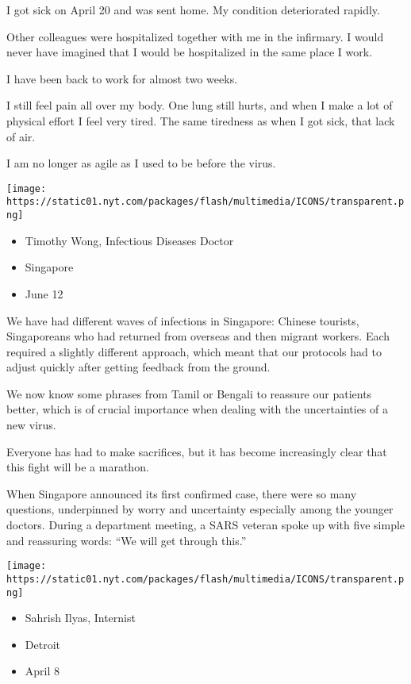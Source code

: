I got sick on April 20 and was sent home. My condition deteriorated
rapidly.

Other colleagues were hospitalized together with me in the infirmary. I
would never have imagined that I would be hospitalized in the same place
I work.

I have been back to work for almost two weeks.

I still feel pain all over my body. One lung still hurts, and when I
make a lot of physical effort I feel very tired. The same tiredness as
when I got sick, that lack of air.

I am no longer as agile as I used to be before the virus.

\texttt{[image: https://static01.nyt.com/packages/flash/multimedia/ICONS/transparent.png]}

\begin{itemize}
\tightlist
\item
  Timothy Wong, Infectious Diseases Doctor
\item
  Singapore
\item
  June 12
\end{itemize}

We have had different waves of infections in Singapore: Chinese
tourists, Singaporeans who had returned from overseas and then migrant
workers. Each required a slightly different approach, which meant that
our protocols had to adjust quickly after getting feedback from the
ground.

We now know some phrases from Tamil or Bengali to reassure our patients
better, which is of crucial importance when dealing with the
uncertainties of a new virus.

Everyone has had to make sacrifices, but it has become increasingly
clear that this fight will be a marathon.

When Singapore announced its first confirmed case, there were so many
questions, underpinned by worry and uncertainty especially among the
younger doctors. During a department meeting, a SARS veteran spoke up
with five simple and reassuring words: ``We will get through this.''

\texttt{[image: https://static01.nyt.com/packages/flash/multimedia/ICONS/transparent.png]}

\begin{itemize}
\tightlist
\item
  Sahrish Ilyas, Internist
\item
  Detroit
\item
  April 8
\end{itemize}

